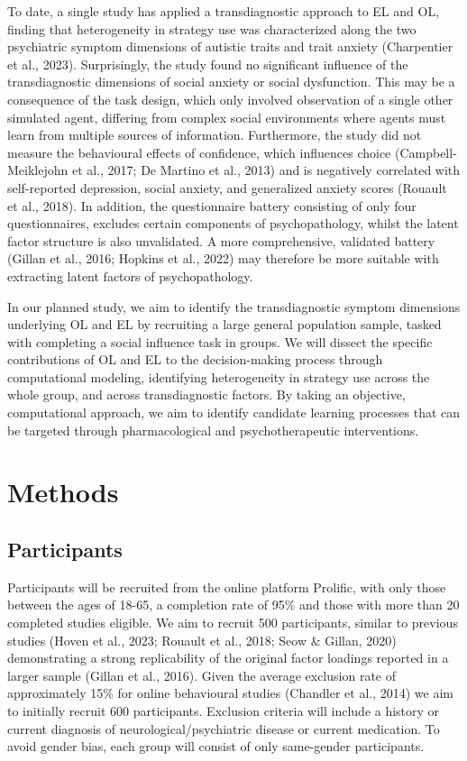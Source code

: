 \documentclass[12pt,a4paper,oneside,]{book} %
\begin{document}
To date, a single study has applied a transdiagnostic approach to EL and OL, finding that heterogeneity in strategy use was characterized along the two psychiatric symptom dimensions of autistic traits and trait anxiety (Charpentier et al., 2023). Surprisingly, the study found no significant influence of the transdiagnostic dimensions of social anxiety or social dysfunction. This may be a consequence of the task design, which only involved observation of a single other simulated agent, differing from complex social environments where agents must learn from multiple sources of information. Furthermore, the study did not measure the behavioural effects of confidence, which influences choice (Campbell-Meiklejohn et al., 2017; De Martino et al., 2013) and is negatively correlated with self-reported depression, social anxiety, and generalized anxiety scores (Rouault et al., 2018). In addition, the questionnaire battery consisting of only four questionnaires, excludes certain components of psychopathology, whilst the latent factor structure is also unvalidated. A more comprehensive, validated battery (Gillan et al., 2016; Hopkins et al., 2022) may therefore be more suitable with extracting latent factors of psychopathology.

In our planned study, we aim to identify the transdiagnostic symptom dimensions underlying OL and EL by recruiting a large general population sample, tasked with completing a social influence task in groups. We will dissect the specific contributions of OL and EL to the decision-making process through computational modeling, identifying heterogeneity in strategy use across the whole group, and across transdiagnostic factors. By taking an objective, computational approach, we aim to identify candidate learning processes that can be targeted through pharmacological and psychotherapeutic interventions.

\section{Methods}\label{methods}

\subsection{Participants}\label{participants}

Participants will be recruited from the online platform Prolific, with only those between the ages of 18-65, a completion rate of 95\% and those with more than 20 completed studies eligible. We aim to recruit 500 participants, similar to previous studies (Hoven et al., 2023; Rouault et al., 2018; Seow \& Gillan, 2020) demonstrating a strong replicability of the original factor loadings reported in a larger sample (Gillan et al., 2016). Given the average exclusion rate of approximately 15\% for online behavioural studies (Chandler et al., 2014) we aim to initially recruit 600 participants. Exclusion criteria will include a history or current diagnosis of neurological/psychiatric disease or current medication. To avoid gender bias, each group will consist of only same-gender participants.
\end{document}
